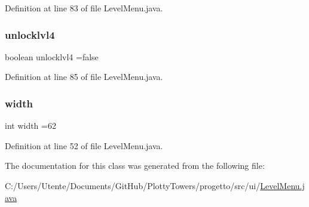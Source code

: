 Definition at line 83 of file Level\+Menu.\+java.

\mbox{\label{classui_1_1_level_menu_af19dc9730ad4c9f05adee1ce65675728}} 
\subsubsection{\texorpdfstring{unlocklvl4}{unlocklvl4}}
{\footnotesize\ttfamily boolean unlocklvl4 =false}



Definition at line 85 of file Level\+Menu.\+java.

\mbox{\label{classui_1_1_level_menu_a2474a5474cbff19523a51eb1de01cda4}} 
\subsubsection{\texorpdfstring{width}{width}}
{\footnotesize\ttfamily int width =62\hspace{0.3cm}{\ttfamily [private]}}



Definition at line 52 of file Level\+Menu.\+java.



The documentation for this class was generated from the following file\+:\begin{DoxyCompactItemize}
\item 
C\+:/\+Users/\+Utente/\+Documents/\+Git\+Hub/\+Plotty\+Towers/progetto/src/ui/\hyperlink{_level_menu_8java}{Level\+Menu.\+java}\end{DoxyCompactItemize}
